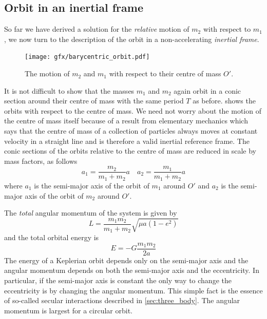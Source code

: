 \documentclass[twoside,openright,titlepage,numbers=noenddot,headinclude,%
                footinclude=true,cleardoublepage=empty,abstractoff, 
                BCOR=5mm,paper=a4,fontsize=11pt,%
                american,%
                ]{scrreprt}%
\begin{document}
\subsection{Orbit in an inertial frame}
So far we have derived a solution for the \emph{relative} motion
of $m_2$ with respect to $m_1$, we now turn to the description of the
orbit in a non-accelerating \emph{inertial frame}.
\begin{figure}[htb]
\centering
\texttt{[image: gfx/barycentric\_orbit.pdf]}
    \caption[Barycentric orbit.]{The motion of $m_2$ and $m_1$ 
    with respect to their centre
    of mass $O'$.}
\label{fig:barycentric_orbit}
\end{figure}
It is not difficult to show that the masses $m_1$ and $m_2$ again
orbit in a conic section around their centre of mass with the same
period $T$ as before. 
 shows the orbits with respect to the
centre of mass. We need not worry about the motion of the centre
of mass itself because of a result from elementary mechanics which says
that the centre of mass of a collection of particles always moves at
constant velocity in a straight line and is therefore a valid inertial
reference frame. The conic sections of the orbits relative to the centre
of mass are 
reduced in scale by mass factors, as follows
\begin{equation}
    a_1= \frac{m_2}{m_1 + m_2} a\quad a_2= \frac{m_1}{m_1 + m_2} a
\end{equation}
where $a_1$ is the semi-major axis of the orbit of $m_1$ around $O'$
and $a_2$ is the semi-major axis of the orbit of $m_2$ around $O'$.

The \emph{total} angular momentum of the system is given by 
\begin{equation}
    L= \frac{m_1 m_2}{m_1 + m_2} \sqrt{\mu a(1-e^2)}
    \label{eq:ang_momentum}
\end{equation}
and the total orbital energy is
\begin{equation}
    E= -G \frac{m_1 m_2}{2a} 
\end{equation}
The energy of a Keplerian orbit depends only on the semi-major axis
and the angular momentum depends on both the semi-major axis and
the eccentricity. In particular, if the semi-major axis is constant
the only way to change the eccentricity is by changing the angular
momentum. This simple fact is the essence of so-called secular
interactions described in \cref{sec:three_body}. The angular momentum
is largest for a circular orbit.
\end{document}
